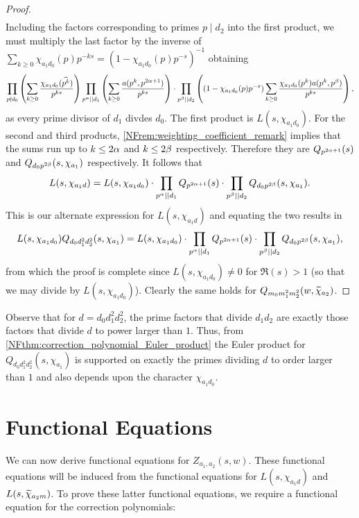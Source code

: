 \begin{proof}
\begin{align*}
        \end{align*}
        Including the factors corresponding to primes $p \mid d_{2}$ into the first product, we must multiply the last factor by the inverse of $\sum_{k \ge 0}\chi_{a_{1}d_{0}}(p)p^{-ks} = (1-\chi_{a_{1}d_{0}}(p)p^{-s})^{-1}$ obtaining
        \[
            \prod_{p \nmid d_{0}}\left(\sum_{k \ge 0}\frac{\chi_{a_{1}d_{0}}(\widehat{p^{k}})}{p^{ks}}\right)\prod_{p^{\alpha} \mid\mid d_{1}}\left(\sum_{k \ge 0}\frac{a(p^{k},p^{2\alpha+1})}{p^{ks}}\right) \cdot \prod_{p^{\beta} \mid\mid d_{2}}\left((1-\chi_{a_{1}d_{0}}(p)p^{-s})\sum_{k \ge 0}\frac{\chi_{a_{1}d_{0}}(p^{k})a(p^{k},p^{\beta})}{p^{ks}}\right),
        \]
        as every prime divisor of $d_{1}$ divdes $d_{0}$. The first product is $L(s,\chi_{a_{1}d_{0}})$. For the second and third products, \cref{NFrem:weighting_coefficient_remark} implies that the sums run up to $k \le 2\alpha$ and $k \le 2\beta$ respectively. Therefore they are $Q_{p^{2\alpha+1}}(s)$ and $Q_{d_{0}p^{2\beta}}(s,\chi_{a_{1}})$ respectively. It follows that
        \[
            L(s,\chi_{a_{1}d}) = L(s,\chi_{a_{1}d_{0}}) \cdot \prod_{p^{\alpha} \mid\mid d_{1}}Q_{p^{2\alpha+1}}(s) \cdot \prod_{p^{\beta} \mid\mid d_{2}}Q_{d_{0}p^{2\beta}}(s,\chi_{a_{1}}).
        \]
        This is our alternate expression for $L(s,\chi_{a_{1}d})$ and equating the two results in
        \[
            L(s,\chi_{a_{1}d_{0}})Q_{d_{0}d_{1}^{2}d_{2}^{2}}(s,\chi_{a_{1}}) = L(s,\chi_{a_{1}d_{0}}) \cdot \prod_{p^{\alpha} \mid\mid d_{1}}Q_{p^{2\alpha+1}}(s) \cdot \prod_{p^{\beta} \mid\mid d_{2}}Q_{d_{0}p^{2\beta}}(s,\chi_{a_{1}}),
        \]
        from which the proof is complete since $L(s,\chi_{a_{1}d_{0}}) \neq 0$ for $\Re(s) > 1$ (so that we may divide by $L(s,\chi_{a_{1}d_{0}})$). Clearly the same holds for $Q_{m_{0}m_{1}^{2}m_{2}^{2}}(w,\widetilde{\chi}_{a_{2}})$.
    \end{proof}

    Observe that for $d = d_{0}d_{1}^{2}d_{2}^{2}$, the prime factors that divide $d_{1}d_{2}$ are exactly those factors that divide $d$ to power larger than $1$. Thus, from \cref{NFthm:correction_polynomial_Euler_product} the Euler product for $Q_{d_{0}d_{1}^{2}d_{2}^{2}}(s,\chi_{a_{1}})$ is supported on exactly the primes dividing $d$ to order larger than $1$ and also depends upon the character $\chi_{a_{1}d_{0}}$.
\section{Functional Equations}
    We can now derive functional equations for $Z_{a_{1},a_{2}}(s,w)$. These functional equations will be induced from the functional equations for $L(s,\chi_{a_{1}d})$ and $L(s,\widetilde{\chi}_{a_{2}m})$. To prove these latter functional equations, we require a functional equation for the correction polynomials:

